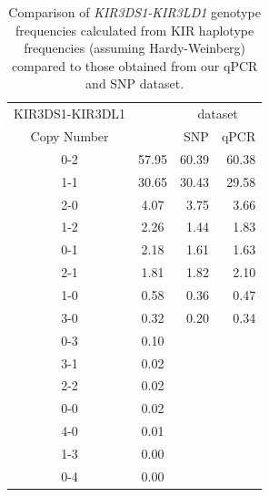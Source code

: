 \documentclass[12pt,a4paper,twoside]{article}
\begin{document}
\begin{table}[ht]
\centering
\begin{tabular}{ccrr}
  \hline
  KIR3DS1-KIR3DL1 & & \multicolumn{2}{c}{dataset} \\
  Copy Number & \citet{Jiang:2012cf} & SNP & qPCR \\ 
  \hline
0-2 & 57.95 & 60.39 & 60.38 \\ 
1-1 & 30.65 & 30.43 & 29.58 \\ 
2-0 & 4.07 & 3.75 & 3.66 \\ 
1-2 & 2.26 & 1.44 & 1.83 \\ 
0-1 & 2.18 & 1.61 & 1.63 \\ 
2-1 & 1.81 & 1.82 & 2.10 \\ 
1-0 & 0.58 & 0.36 & 0.47 \\ 
3-0 & 0.32 & 0.20 & 0.34 \\ 
0-3 & 0.10 &  &  \\ 
3-1 & 0.02 &  &  \\ 
2-2 & 0.02 &  &  \\ 
0-0 & 0.02 &  &  \\ 
4-0 & 0.01 &  &  \\ 
1-3 & 0.00 &  &  \\ 
0-4 & 0.00 &  &  \\ 
   \hline
\end{tabular}
\caption{ Comparison of \emph{KIR3DS1-KIR3LD1} genotype frequencies calculated from \citet{Jiang:2012cf} KIR haplotype frequencies (assuming Hardy-Weinberg) compared to those
obtained from our qPCR and SNP dataset. }
\end{table}






%
\end{document}

